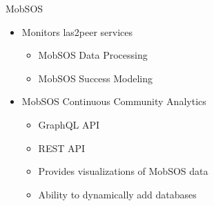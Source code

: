 \begin{frame}{MobSOS}

  \begin{itemize}
    \item Monitors las2peer services \cite{Renz16}
    \begin{itemize}
        \item MobSOS Data Processing
        \item MobSOS Success Modeling
    \end{itemize}
    \item MobSOS Continuous Community Analytics \cite{Kers20} 
          \begin{itemize}
            \item GraphQL API
            \item REST API
            \item Provides visualizations of MobSOS data
            \item Ability to dynamically add databases
          \end{itemize}
  \end{itemize}
\end{frame}



